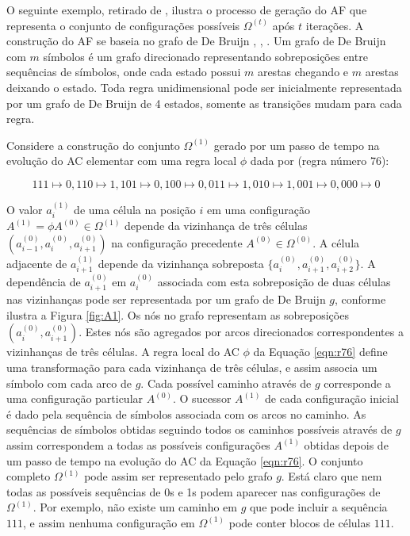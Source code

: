 \documentclass[12pt,a4paper]{article}
\begin{document}
O seguinte exemplo, retirado de , ilustra o processo de
geração do AF que representa o conjunto de configurações
possíveis $\Omega^{(t)}$ após $t$ iterações. A construção do AF se baseia no
grafo de De Bruijn , ,
. Um grafo de De Bruijn com $m$ símbolos
é um grafo direcionado representando sobreposições entre sequências de símbolos,
onde cada estado possui $m$ arestas chegando e $m$ arestas deixando o estado.
Toda regra unidimensional pode ser inicialmente representada por um grafo de De
Bruijn de 4 estados, somente as transições mudam para cada regra.

Considere a construção do conjunto $\Omega^{(1)}$ gerado por um passo de
tempo na evolução do AC elementar com uma regra
local $\phi$ dada por (regra número 76):

\begin{equation}\label{eqn:r76}
111 \mapsto 0, 110 \mapsto 1, 101 \mapsto 0, 100 \mapsto 0, 011 \mapsto 1, 010 \mapsto 1,
001 \mapsto 0, 000 \mapsto 0
\end{equation}

O valor $a_i^{(1)}$ de uma célula na posição $i$ em uma configuração
$A^{(1)} = \phi A^{(0)} \in \Omega^{(1)}$ depende da vizinhança de três
células $(a_{i-1}^{(0)},a_i^{(0)},a_{i+1}^{(0)})$ na configuração precedente
$A^{(0)} \in \Omega^{(0)}$. A célula adjacente de $a_{i+1}^{(1)}$ depende da
vizinhança sobreposta $\{a_i^{(0)},a_{i+1}^{(0)},a_{i+2}^{(0)}\}$. A
dependência de $a_{i+1}^{(0)}$ em $a_i^{(0)}$ associada com esta sobreposição
de duas células nas vizinhanças pode ser representada por um grafo de
De Bruijn $g$, conforme
ilustra a Figura \ref{fig:A1}. Os nós no grafo representam as sobreposições
$(a_i^{(0)},a_{i+1}^{(0)})$. Estes nós são agregados por arcos direcionados
correspondentes a vizinhanças de três células. A regra local do AC
$\phi$ da Equação \ref{eqn:r76} define uma transformação para cada
vizinhança de três células, e assim associa um símbolo com cada arco de $g$.
Cada possível caminho através de $g$ corresponde a uma configuração particular
$A^{(0)}$. O sucessor $A^{(1)}$ de cada configuração inicial é dado pela
sequência de símbolos associada com os arcos no caminho. As sequências de
símbolos obtidas seguindo todos os caminhos possíveis através de $g$ assim
correspondem a todas as possíveis configurações $A^{(1)}$ obtidas depois
de um passo de tempo na evolução do AC da Equação \ref{eqn:r76}. O
conjunto completo $\Omega^{(1)}$ pode assim ser representado pelo grafo
$g$. Está claro que nem todas as possíveis sequências de 0s e 1s podem
aparecer nas configurações de $\Omega^{(1)}$. Por exemplo, não existe um
caminho em $g$ que pode incluir a sequência $111$, e assim nenhuma
configuração em $\Omega^{(1)}$ pode conter blocos de células $111$.
\end{document}
